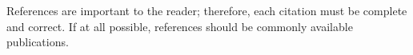\documentclass[letterpaper, 10 pt, conference]{ieeeconf}  %
\begin{document}
References are important to the reader; therefore, each citation must be complete and correct. If at all possible, references should be commonly available publications.







\end{document}
